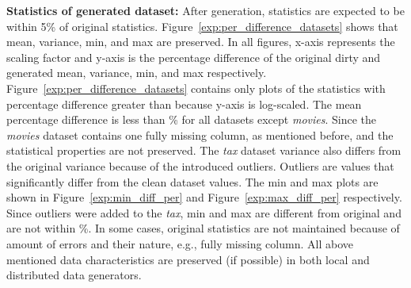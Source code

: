 
\textbf{Statistics of generated dataset:} 
After generation, statistics are expected to be within 5\% of original statistics.
Figure~\ref{exp:per_difference_datasets} shows that mean, variance, min, and max are preserved.
In all figures, x-axis represents the scaling factor and y-axis is the percentage difference of the original dirty and generated mean, variance, min, and max respectively.
Figure~\ref{exp:per_difference_datasets} contains only plots of the statistics with percentage difference greater than  because y-axis is log-scaled.
The mean percentage difference is less than \% for all datasets except \textit{movies}.
Since the \textit{movies} dataset contains one fully missing column, as mentioned before, and the statistical properties are not preserved.
The \textit{tax} dataset variance also differs from the original variance because of the introduced outliers. 
Outliers are values that significantly differ from the clean dataset values.
The min and max plots are shown in Figure~\ref{exp:min_diff_per} and Figure~\ref{exp:max_diff_per} respectively.
Since outliers were added to the \textit{tax}, min and max are different from original and are not within \%.
In some cases, original statistics are not maintained because of amount of errors and their nature, e.g., fully missing column.
All above mentioned data characteristics are preserved (if possible) in both local and distributed data generators.


